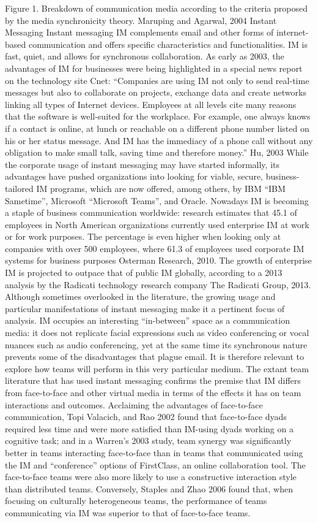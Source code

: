 Figure 1. Breakdown of communication media according to the criteria proposed by the media synchronicity theory. Maruping and Agarwal, 2004 
Instant Messaging
Instant messaging IM complements email and other forms of internet-based communication and offers specific characteristics and functionalities. IM is fast, quiet, and allows for synchronous collaboration. As early as 2003, the advantages of IM for businesses were being highlighted in a special news report on the technology site Cnet: “Companies are using IM not only to send real-time messages but also to collaborate on projects, exchange data and create networks linking all types of Internet devices. Employees at all levels cite many reasons that the software is well-suited for the workplace. For example, one always knows if a contact is online, at lunch or reachable on a different phone number listed on his or her status message. And IM has the immediacy of a phone call without any obligation to make small talk, saving time and therefore money.” Hu, 2003
While the corporate usage of instant messaging may have started informally, its advantages have pushed organizations into looking for viable, secure, business-tailored IM programs, which are now offered, among others, by IBM “IBM Sametime”, Microsoft “Microsoft Teams”, and Oracle.
Nowadays IM is becoming a staple of business communication worldwide: research estimates that 45.1 of employees in North American organizations currently used enterprise IM at work or for work purposes. The percentage is even higher when looking only at companies with over 500 employees, where 61.3 of employees used corporate IM systems for business purposes Osterman Research, 2010. The growth of enterprise IM is projected to outpace that of public IM globally, according to a 2013 analysis by the Radicati technology research company The Radicati Group, 2013. 
Although sometimes overlooked in the literature, the growing usage and particular manifestations of instant messaging make it a pertinent focus of analysis. IM occupies an interesting “in-between” space as a communication media: it does not replicate facial expressions such as video conferencing or vocal nuances such as audio conferencing, yet at the same time its synchronous nature prevents some of the disadvantages that plague email. It is therefore relevant to explore how teams will perform in this very particular medium.
The extant team literature that has used instant messaging confirms the premise that IM differs from face-to-face and other virtual media in terms of the effects it has on team interactions and outcomes. Acclaiming the advantages of face-to-face communication, Topi Valacich, and Rao 2002 found that face-to-face dyads required less time and were more satisfied than IM-using dyads working on a cognitive task; and in a Warren’s 2003 study, team synergy was significantly better in teams interacting face-to-face than in teams that communicated using the IM and “conference” options of FirstClass, an online collaboration tool. The face-to-face teams were also more likely to use a constructive interaction style than distributed teams. Conversely, Staples and Zhao 2006 found that, when focusing on culturally heterogeneous teams, the performance of teams communicating via IM was superior to that of face-to-face teams.
